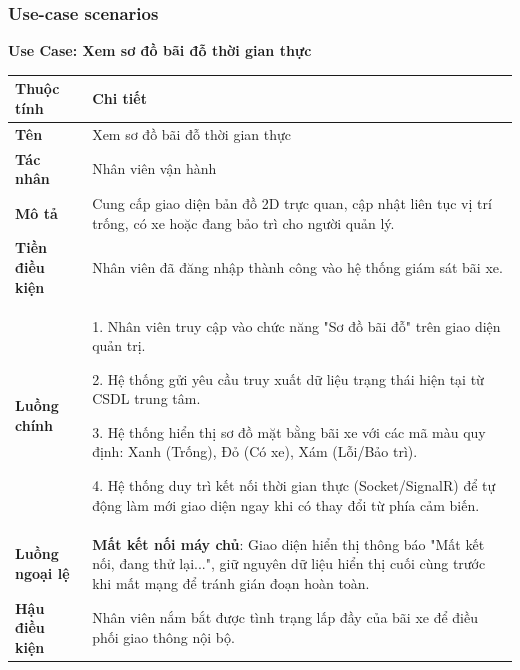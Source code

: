 \subsubsection{Use-case scenarios}
\noindent \textbf{Use Case: Xem sơ đồ bãi đỗ thời gian thực} \\
\renewcommand{\arraystretch}{1.6}
\begin{xltabular}{\textwidth}{|l|X|}
\hline
\textbf{Thuộc tính} & \textbf{Chi tiết} \\
\hline
\textbf{Tên} & Xem sơ đồ bãi đỗ thời gian thực \\
\hline
\textbf{Tác nhân} & Nhân viên vận hành \\
\hline
\textbf{Mô tả} & Cung cấp giao diện bản đồ 2D trực quan, cập nhật liên tục vị trí trống, có xe hoặc đang bảo trì cho người quản lý. \\
\hline
\textbf{Tiền điều kiện} & Nhân viên đã đăng nhập thành công vào hệ thống giám sát bãi xe. \\
\hline
\textbf{Luồng chính} & 
1. Nhân viên truy cập vào chức năng "Sơ đồ bãi đỗ" trên giao diện quản trị.

2. Hệ thống gửi yêu cầu truy xuất dữ liệu trạng thái hiện tại từ CSDL trung tâm.

3. Hệ thống hiển thị sơ đồ mặt bằng bãi xe với các mã màu quy định: Xanh (Trống), Đỏ (Có xe), Xám (Lỗi/Bảo trì).

4. Hệ thống duy trì kết nối thời gian thực (Socket/SignalR) để tự động làm mới giao diện ngay khi có thay đổi từ phía cảm biến.\\
\hline

\textbf{Luồng ngoại lệ} & 
\textbf{Mất kết nối máy chủ}: Giao diện hiển thị thông báo "Mất kết nối, đang thử lại...", giữ nguyên dữ liệu hiển thị cuối cùng trước khi mất mạng để tránh gián đoạn hoàn toàn.\\
\hline

\textbf{Hậu điều kiện} & Nhân viên nắm bắt được tình trạng lấp đầy của bãi xe để điều phối giao thông nội bộ. \\
\hline
\end{xltabular}

